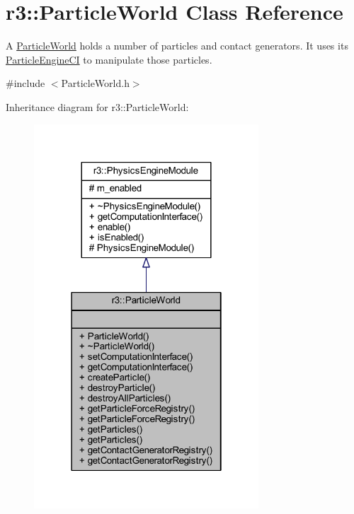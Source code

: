 \hypertarget{classr3_1_1_particle_world}{}\section{r3\+:\+:Particle\+World Class Reference}
\label{classr3_1_1_particle_world}


A \mbox{\hyperlink{classr3_1_1_particle_world}{Particle\+World}} holds a number of particles and contact generators. It uses its \mbox{\hyperlink{classr3_1_1_particle_engine_c_i}{Particle\+Engine\+CI}} to manipulate those particles.  




{\ttfamily \#include $<$Particle\+World.\+h$>$}



Inheritance diagram for r3\+:\+:Particle\+World\+:\nopagebreak
\begin{figure}[H]
\begin{center}
\leavevmode
\includegraphics[width=238pt]{classr3_1_1_particle_world__inherit__graph}
\end{center}
\end{figure}


